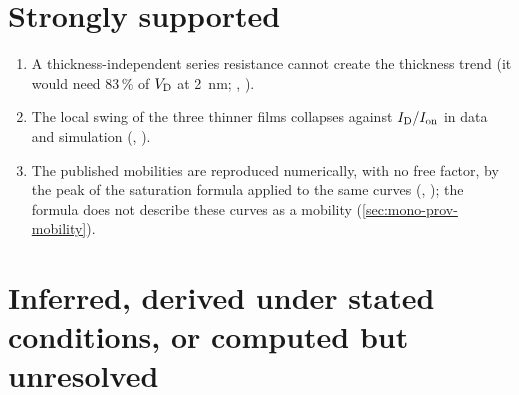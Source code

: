 \section{Strongly supported}
\label{sec:concl-supported}

\begin{enumerate}
\item A thickness-independent series resistance cannot create the thickness trend (it would need 83\,\% of $V_{\mathrm{D}}$ at
2~nm; , ).
\item The local swing of the three thinner films collapses against $I_{\mathrm{D}}/I_{\mathrm{on}}$ in data and simulation (,
).
\item The published mobilities are reproduced numerically, with no free factor, by the peak of the saturation formula
applied to the same curves (, ); the formula does not describe these curves as a mobility
(\cref{sec:mono-prov-mobility}).
\end{enumerate}

\section{Inferred, derived under stated conditions, or computed but unresolved}
\label{sec:concl-inferred}

